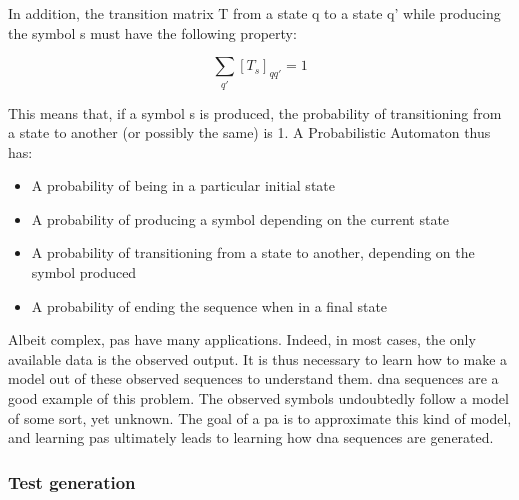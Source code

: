 In addition, the transition matrix T from a state q to a state q'
while producing the symbol s must have the following property:

\[
\sum_{q'}[T_{s}]_{qq'}=1
\]


This means that, if a symbol s is produced, the probability of transitioning
from a state to another (or possibly the same) is 1. A Probabilistic
Automaton thus has:
\begin{itemize}
\item A probability of being in a particular initial state
\item A probability of producing a symbol depending on the current state
\item A probability of transitioning from a state to another, depending
on the symbol produced
\item A probability of ending the sequence when in a final state
\end{itemize}
Albeit complex, \gls{pa}s have many applications. Indeed, in most cases,
the only available data is the observed output. It is thus necessary
to learn how to make a model out of these observed sequences to understand
them. \gls{dna} sequences are a good example of this problem. The observed
symbols undoubtedly follow a model of some sort, yet unknown. The
goal of a \gls{pa} is to approximate this kind of model, and learning \gls{pa}s
ultimately leads to learning how \gls{dna} sequences are generated.


\subsubsection{Test generation}

